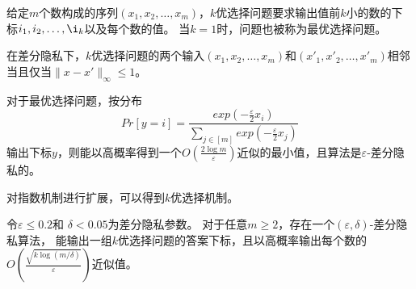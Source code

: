 \begin{definition}[$k$优选择问题]
    给定$m$个数构成的序列$(x_1,x_2,\ldots,x_m)$，$k$优选择问题要求输出值前$k$小的数的下标$i_1,i_2,\ldots,\i_k$以及每个数的值。
    当$k=1$时，问题也被称为最优选择问题。
\end{definition}
    在差分隐私下，$k$优选择问题的两个输入$(x_1,x_2,\ldots,x_m)$和$(x'_1,x'_2,\ldots,x'_m)$相邻当且仅当$\|x-x'\|_\infty\leq 1$。
\begin{theorem}[指数机制]\cite{mcsherry2007mechanism}
    对于最优选择问题，按分布
    \begin{equation*}
        Pr[y=i]=\frac{exp(-\frac{\varepsilon}{2}x_i)}{\sum_{j\in[m]}exp(-\frac{\varepsilon}{2}x_j)}
    \end{equation*}
   输出下标$y$，则能以高概率得到一个$O(\frac{2\log m}{\varepsilon})$近似的最小值，且算法是$\varepsilon$-差分隐私的。
\end{theorem}

对指数机制进行扩展，可以得到$k$优选择机制。

\begin{theorem}[$k$优选择机制]\cite{qiao2021oneshot}
    \label{the:topk}
    令$\varepsilon\leq 0.2 $和 
    $ \delta < 0.05 $为差分隐私参数。
    对于任意$m\geq 2$，存在一个$(\varepsilon,\delta)$-差分隐私算法，
    能输出一组$k$优选择问题的答案下标，且以高概率输出每个数的$O(\frac{\sqrt{k\log(m/\delta)}}{\varepsilon})$近似值。
\end{theorem}

